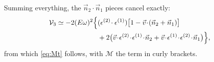 \documentclass[12pt,a4paper,oneside]{article}
\numberwithin{equation}{section}   %
\begin{document}
\bigskip
\noindent
Summing everything, the $\vec n_2\!\cdot\!\vec n_1$ pieces cancel exactly:
\begin{equation}
\begin{split}
\mathcal{V}_3\simeq-2(E\omega)^2\Bigl\{&(\epsilon^{(2)}\!\cdot\epsilon^{(1)})
\bigl[1-\vec v\!\cdot\!(\vec n_2+\vec n_1)\bigr]\\
&+2\bigl(\vec v\!\cdot\!\epsilon^{(2)}\!\cdot\!\epsilon^{(1)}\!\cdot\!\vec n_2
+\vec v\!\cdot\!\epsilon^{(1)}\!\cdot\!\epsilon^{(2)}\!\cdot\!\vec n_1\bigr)\Bigr\},
\end{split}
\label{eq:V3-limit}
\end{equation}
from which \eqref{eq:Mt} follows, with $\mathcal M$ the term in curly brackets.
\end{document}
